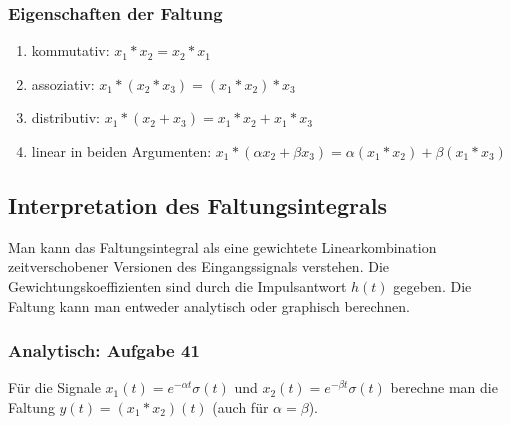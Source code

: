 \documentclass[11pt]{article}
\begin{document}
\subsubsection*{Eigenschaften der Faltung}
\begin{enumerate}
    \item kommutativ: $x_1 \ast x_2 = x_2 \ast x_1$
    \item assoziativ: $x_1 \ast (x_2 \ast x_3) = (x_1 \ast x_2) \ast x_3$
    \item distributiv: $x_1 \ast (x_2 + x_3) = x_1 \ast x_2 + x_1 \ast x_3$
    \item linear in beiden Argumenten: $x_1 \ast (\alpha x_2 + \beta x_3) = \alpha (x_1 \ast x_2) + \beta (x_1 \ast x_3)$
\end{enumerate}

\subsection*{Interpretation des Faltungsintegrals}
\vspace*{-0.5cm}
Man kann das Faltungsintegral als eine gewichtete Linearkombination zeitverschobener Versionen des Eingangssignals verstehen. Die Gewichtungskoeffizienten sind durch die Impulsantwort $h(t)$ gegeben.
Die Faltung kann man entweder analytisch oder graphisch berechnen.

\vfill \null
\pagebreak

\subsubsection*{Analytisch: Aufgabe 41}
\vspace*{-0.5cm}
Für die Signale $x_1(t) = e^{-\alpha t}\sigma(t)$ und $x_2(t) = e^{-\beta t}\sigma(t)$ berechne man die Faltung $y(t) = (x_1 \ast x_2)(t)$ (auch für $\alpha = \beta$).

\end{document}
